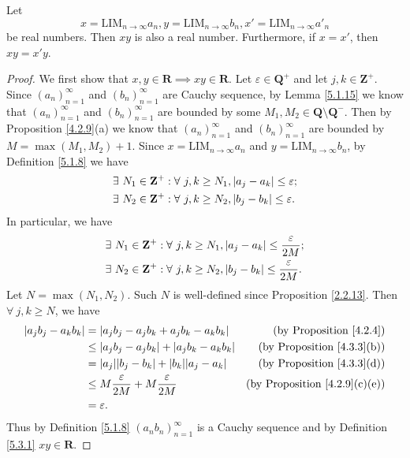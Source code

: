 \begin{proposition}\label{5.3.10}
    Let
    \[
        x = \text{LIM}_{n \to \infty} a_n, y = \text{LIM}_{n \to \infty} b_n, x' = \text{LIM}_{n \to \infty} a'_n
    \]
    be real numbers.
    Then \(xy\) is also a real number.
    Furthermore, if \(x = x'\), then \(xy = x'y\).
\end{proposition}

\begin{proof}
    We first show that \(x, y \in \mathbf{R} \implies xy \in \mathbf{R}\).
    Let \(\varepsilon \in \mathbf{Q}^+\) and let \(j, k \in \mathbf{Z}^+\).
    Since \((a_n)_{n = 1}^\infty\) and \((b_n)_{n = 1}^\infty\) are Cauchy sequence, by Lemma \ref{5.1.15} we know that \((a_n)_{n = 1}^\infty\) and \((b_n)_{n = 1}^\infty\) are bounded by some \(M_1, M_2 \in \mathbf{Q} \setminus \mathbf{Q}^-\).
    Then by Proposition \ref{4.2.9}(a) we know that \((a_n)_{n = 1}^\infty\) and \((b_n)_{n = 1}^\infty\) are bounded by \(M = \max(M_1, M_2) + 1\).
    Since \(x = \text{LIM}_{n \to \infty} a_n\) and \(y = \text{LIM}_{n \to \infty} b_n\), by Definition \ref{5.1.8} we have
    \begin{align*}
         & \exists\ N_1 \in \mathbf{Z}^+ : \forall\ j, k \geq N_1, \abs*{a_j - a_k} \leq \varepsilon; \\
         & \exists\ N_2 \in \mathbf{Z}^+ : \forall\ j, k \geq N_2, \abs*{b_j - b_k} \leq \varepsilon.
    \end{align*}
    In particular, we have
    \begin{align*}
         & \exists\ N_1 \in \mathbf{Z}^+ : \forall\ j, k \geq N_1, \abs*{a_j - a_k} \leq \frac{\varepsilon}{2M}; \\
         & \exists\ N_2 \in \mathbf{Z}^+ : \forall\ j, k \geq N_2, \abs*{b_j - b_k} \leq \frac{\varepsilon}{2M}.
    \end{align*}
    Let \(N = \max(N_1, N_2)\).
    Such \(N\) is well-defined since Proposition \ref{2.2.13}.
    Then \(\forall\ j, k \geq N\), we have
    \begin{align*}
        \abs*{a_j b_j - a_k b_k} & = \abs*{a_j b_j - a_j b_k + a_j b_k - a_k b_k}              & \text{(by Proposition \ref{4.2.4})}       \\
                                 & \leq \abs*{a_j b_j - a_j b_k} + \abs*{a_j b_k - a_k b_k}    & \text{(by Proposition \ref{4.3.3}(b))}    \\
                                 & = \abs*{a_j} \abs*{b_j - b_k} + \abs*{b_k} \abs*{a_j - a_k} & \text{(by Proposition \ref{4.3.3}(d))}    \\
                                 & \leq M \frac{\varepsilon}{2M} + M \frac{\varepsilon}{2M}    & \text{(by Proposition \ref{4.2.9}(c)(e))} \\
                                 & = \varepsilon.
    \end{align*}
    Thus by Definition \ref{5.1.8} \((a_n b_n)_{n = 1}^\infty\) is a Cauchy sequence and by Definition \ref{5.3.1} \(xy \in \mathbf{R}\).


\end{proof}
